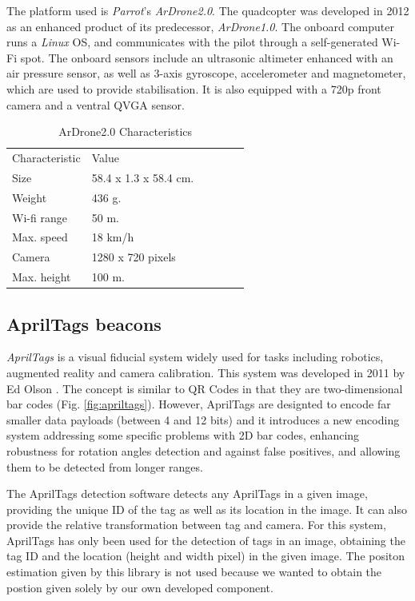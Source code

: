 \documentclass{styles/svproc}
\begin{document}
	The platform used is \textit{Parrot}'s \textit{ArDrone2.0}. The quadcopter was developed in 2012 as an enhanced product of its predecessor, \textit{ArDrone1.0}. The onboard computer runs a \textit{Linux} OS, and communicates with the pilot through a self-generated Wi-Fi spot. The onboard sensors include an ultrasonic altimeter enhanced with an air pressure sensor, as well as 3-axis gyroscope, accelerometer and magnetometer, which are used to provide stabilisation. It is also equipped with a 720p front camera and a ventral QVGA sensor.
	
	\begin{table}
	\centering
	\setlength\tabcolsep{7pt}
	\caption{ArDrone2.0 Characteristics}
	\begin{tabular}{llllll}
	\hline\noalign{\smallskip}
	Characteristic  & Value\\
	\noalign{\smallskip}
	\hline
	\noalign{\smallskip}
		Size & 58.4 x 1.3 x 58.4 cm. \\
		Weight & 436 g. \\
		Wi-fi range & 50 m. \\
		Max. speed & 18 km/h \\
		Camera  & 1280 x 720 pixels \\
		Max. height & 100 m.\\
	\hline
	\end{tabular}
	\end{table}

\subsection{AprilTags beacons}

	\textit{AprilTags} is a visual fiducial system widely used for tasks including robotics, augmented reality and camera calibration. This system was developed in 2011 by Ed Olson \cite{eolson}. The concept is similar to QR Codes in that they are two-dimensional bar codes (Fig. \ref{fig:apriltags}). However, AprilTags are designted to encode far smaller data payloads (between 4 and 12 bits) and it introduces a new encoding system addressing some specific problems with 2D bar codes, enhancing robustness for rotation angles detection and against false positives, and allowing them to be detected from longer ranges.
	
	The AprilTags detection software detects any AprilTags in a given image, providing the unique ID of the tag as well as its location in the image. It can also provide the relative transformation between tag and camera. For this system, AprilTags has only been used for the detection of tags in an image, obtaining the tag ID and the location (height and width pixel) in the given image. The positon estimation given by this library is not used because we wanted to obtain the postion given solely by our own developed component.
	
\end{document}
